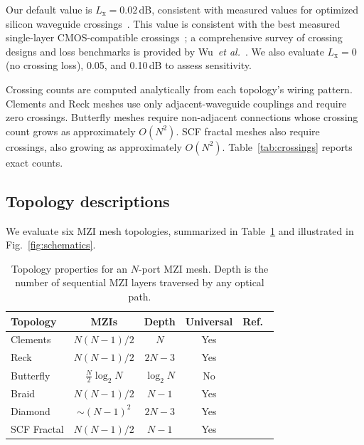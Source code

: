 \documentclass[11pt,a4paper]{article}
\begin{document}
Our default value is $L_{\mathrm{x}} = 0.02$\,dB, consistent with measured values for
optimized silicon waveguide crossings~\cite{shafiee2024}.  This value is
consistent with the best measured single-layer CMOS-compatible
crossings~\cite{johnson2020}; a comprehensive survey of crossing designs and
loss benchmarks is provided by Wu~\textit{et al.}~\cite{wu2020crossings}.
We also evaluate
$L_{\mathrm{x}} = 0$ (no crossing loss), 0.05, and 0.10\,dB to assess sensitivity.

Crossing counts are computed analytically from each topology's wiring pattern.
Clements and Reck meshes use only adjacent-waveguide couplings and require zero
crossings.  Butterfly meshes require non-adjacent connections whose crossing count
grows as approximately $O(N^2)$.  SCF fractal meshes also require crossings,
also growing as approximately $O(N^2)$.  Table~\ref{tab:crossings} reports exact counts.


\subsection{Topology descriptions}
\label{sec:topos}

We evaluate six MZI mesh topologies, summarized in Table~\ref{tab:topologies} and
illustrated in Fig.~\ref{fig:schematics}.

\begin{table}[H]
\centering
\caption{Topology properties for an $N$-port MZI mesh.  Depth is the number of
sequential MZI layers traversed by any optical path.}
\label{tab:topologies}
\begin{tabular}{lcccc}
\toprule
Topology & MZIs & Depth & Universal & Ref.\ \\
\midrule
Clements     & $N(N{-}1)/2$           & $N$         & Yes & \cite{clements2016} \\
Reck         & $N(N{-}1)/2$           & $2N{-}3$    & Yes & \cite{reck1994} \\
Butterfly    & $\tfrac{N}{2}\log_2 N$ & $\log_2 N$  & No  & \cite{tian2022} \\
Braid        & $N(N{-}1)/2$           & $N{-}1$     & Yes & \cite{marchesin2025} \\
Diamond\footnotemark & ${\sim}(N{-}1)^2$ & $2N{-}3$   & Yes & \cite{shokraneh2020} \\
SCF Fractal  & $N(N{-}1)/2$           & $N{-}1$     & Yes & \cite{basani2023} \\
\bottomrule
\end{tabular}
\end{table}
\end{document}
